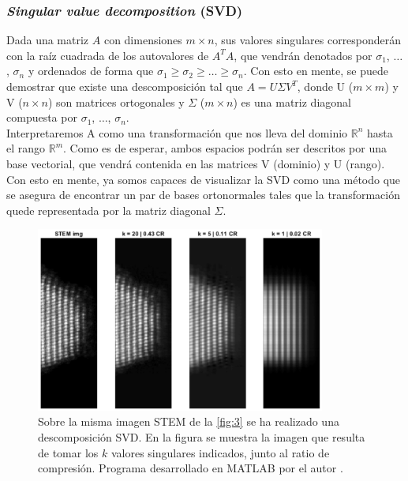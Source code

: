 \subsubsection{\textit{Singular value decomposition} (SVD)}

Dada una matriz $A$ con dimensiones $m \times n$, sus valores singulares corresponderán con la raíz cuadrada de los autovalores de $A^T A$, que vendrán denotados por $\sigma_1$, $\dots$, $\sigma_n$ y ordenados de forma que $\sigma_1 \geq \sigma_2 \geq \dots \geq \sigma_n$. Con esto en mente, se puede demostrar \cite{biblia} que existe una descomposición tal que $A = U \Sigma V^T$, donde U ($m \times m$) y V ($n \times n$) son matrices ortogonales y $\Sigma$ ($m \times n$) es una matriz diagonal compuesta por $\sigma_1$, $\dots$, $\sigma_n$. \\

Interpretaremos A como una transformación que nos lleva del dominio $\mathds{R}^n$ hasta el rango $\mathds{R}^m$. Como es de esperar, ambos espacios podrán ser descritos por una base vectorial, que vendrá contenida en las matrices V (dominio) y U (rango). Con esto en mente, ya somos capaces de visualizar la SVD como una método que se asegura de encontrar un par de bases ortonormales tales que la transformación quede representada por la matriz diagonal $\Sigma$. \\

\newpage
\begin{figure}[h!]
    \centering
    \includegraphics[width=0.85\textwidth]{fig/Fig4.png}
    \caption{Sobre la misma imagen STEM de la \autoref{fig:3} se ha realizado una descomposición SVD. En la figura se muestra la imagen que resulta de tomar los  $k$ valores singulares indicados, junto al ratio de compresión. Programa desarrollado en MATLAB por el autor \cite{repo}.}
    \label{fig:4}
\end{figure}

